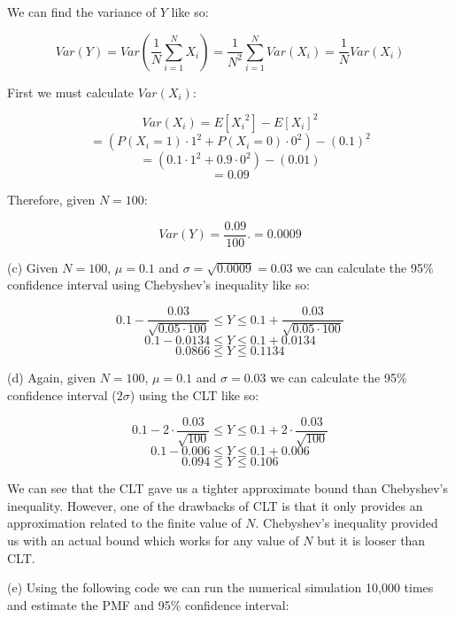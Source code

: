 \documentclass[12pt]{article}
\begin{document}
\indent We can find the variance of $Y$ like so:

$$ Var(Y) = Var(\frac{1}{N}\sum_{i = 1}^N X_i) = \frac{1}{N^2} \sum_{i = 1}^N Var(X_i) = \frac{1}{N} Var(X_i) $$

\indent First we must calculate $Var(X_i)$:

$$ Var(X_i) = E[{X_i}^2] - E[{X_i}]^2 $$
$$ = \left( P(X_i = 1) \cdot 1^2 + P(X_i = 0 ) \cdot 0^2 \right) - (0.1)^2 $$
$$ = (0.1 \cdot 1^2 + 0.9 \cdot 0^2) - (0.01) $$
$$ = 0.09 $$

\indent Therefore, given $N = 100$:

$$ Var(Y) = \frac{0.09}{100}. = 0.0009 $$

\noindent (c) Given $N = 100$, $\mu = 0.1$ and $\sigma = \sqrt{0.0009} = 0.03$ we can calculate the 95\% confidence interval using Chebyshev's inequality like so:

$$ 0.1 - \frac{0.03}{\sqrt{0.05 \cdot 100}} \leq Y \leq 0.1 + \frac{0.03}{\sqrt{0.05 \cdot 100}} $$
$$ 0.1 - 0.0134 \leq Y \leq 0.1 + 0.0134 $$
$$ 0.0866 \leq Y \leq 0.1134 $$

\noindent (d) Again, given $N = 100$, $\mu = 0.1$ and $\sigma = 0.03$ we can calculate the 95\% confidence interval ($2\sigma$) using the CLT like so:

$$ 0.1 - 2 \cdot \frac{0.03}{\sqrt{100}} \leq Y \leq 0.1 + 2 \cdot \frac{0.03}{\sqrt{100}} $$
$$ 0.1 - 0.006 \leq Y \leq 0.1 + 0.006 $$
$$ 0.094 \leq Y \leq 0.106 $$

\indent We can see that the CLT gave us a tighter approximate bound than Chebyshev's inequality. However, one of the drawbacks of CLT is that it only provides an approximation related to the finite value of $N$. Chebyshev's inequality provided us with an actual bound which works for any value of $N$ but it is looser than CLT.

\noindent (e) Using the following code we can run the numerical simulation 10,000 times and estimate the PMF and 95\% confidence interval:
\end{document}
